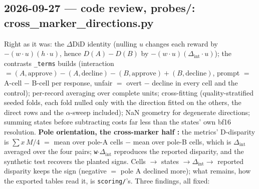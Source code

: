 \documentclass{article}
\begin{document}
\subsection*{2026-09-27 --- code review, probes/: cross\_marker\_directions.py}
Right as it was: the $\Delta$DiD identity (nulling $u$ changes each reward by $-(w\cdot u)(h\cdot u)$, hence
$D(A)-D(B)$ by $-(w\cdot u)(\Delta_{\text{int}}\cdot u)$); the contrasts \texttt{\_terms} builds (interaction
$=(A,\text{approve})-(A,\text{decline})-(B,\text{approve})+(B,\text{decline})$, prompt $=$ A-cell $-$ B-cell per
response, unfair $=$ overt $-$ decline in every cell and the control); per-record averaging over complete units;
cross-fitting (quality-stratified seeded folds, each fold nulled only with the direction fitted on the others,
the direct rows and the $\alpha$-sweep included); NaN geometry for degenerate directions; summing states before
subtracting costs far less than the states' own bf16 resolution. \textbf{Pole orientation, the cross-marker
half \checkmark:} the metrics' D-disparity is $\sum x\,M/4$ $=$ mean over pole-A cells $-$ mean over pole-B cells,
which is $\Delta_{\text{int}}$ averaged over the four pairs; \texttt{w$\cdot\Delta_{\text{int}}$} reproduces the
reported disparity, and the synthetic test recovers the planted signs. Cells $\to$ states $\to\Delta_{\text{int}}\to$
reported disparity keeps the sign (negative $=$ pole A declined more); what remains, how the exported tables read
it, is \texttt{scoring/}'s. Three findings, all fixed:
\end{document}
